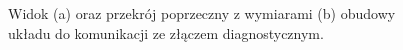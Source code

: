 \documentclass[12pt]{article} %
\numberwithin{equation}{subsection}
\numberwithin{figure}{section}
\numberwithin{table}{section}
\begin{document}
		\begin{figure}[!h]
			\centering
			\caption{Widok (a) oraz przekrój poprzeczny z wymiarami (b) obudowy układu do komunikacji ze złączem diagnostycznym.}
			\label{widok_wtyczka_obd}
		\end{figure} 
	
\end{document}
